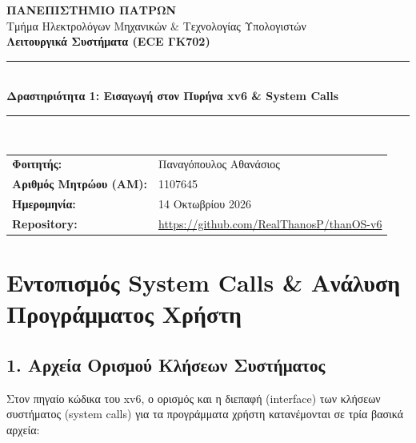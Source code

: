 \documentclass[11pt,a4paper]{article}
\begin{document}
\begin{center}
    {\large \textbf{ΠΑΝΕΠΙΣΤΗΜΙΟ ΠΑΤΡΩΝ}}\\[1mm]
    {\normalsize Τμήμα Ηλεκτρολόγων Μηχανικών \& Τεχνολογίας Υπολογιστών}\\[3mm]
    {\large \textbf{Λειτουργικά Συστήματα (ECE ΓΚ702)}}\\[1mm]
    \rule{\textwidth}{0.8pt}\\[3mm]
    {\LARGE \textbf{Δραστηριότητα 1: Εισαγωγή στον Πυρήνα xv6 \& System Calls}}\\[2mm]
    \rule{\textwidth}{0.8pt}\\[3mm]
    \begin{tabular}{ll}
        \textbf{Φοιτητής:} & Παναγόπουλος Αθανάσιος \\
        \textbf{Αριθμός Μητρώου (ΑΜ):} & 1107645 \\
        \textbf{Ημερομηνία:} & 14 Οκτωβρίου 2026 \\
        \textbf{Repository:} & \url{https://github.com/RealThanosP/thanOS-v6} \\
    \end{tabular}
\end{center}
\vspace{2mm}


\section[Άσκηση 1: System Calls \& Πρόγραμμα Χρήστη]{Εντοπισμός System Calls \& Ανάλυση Προγράμματος Χρήστη}

\subsection*{1. Αρχεία Ορισμού Κλήσεων Συστήματος}

Στον πηγαίο κώδικα του xv6, ο ορισμός και η διεπαφή (interface) των κλήσεων συστήματος (system calls) για τα προγράμματα χρήστη κατανέμονται σε τρία βασικά αρχεία:
\end{document}
